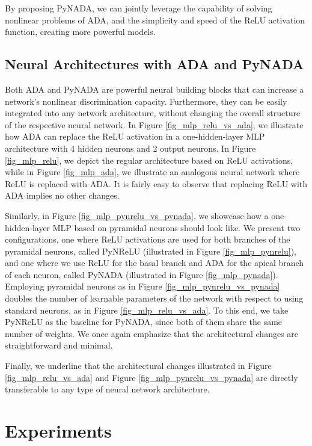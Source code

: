 \documentclass[pdflatex,sn-mathphys]{sn-jnl}
\theoremstyle{thmstyleone}
\theoremstyle{thmstyletwo}\newtheorem{example}{Example}\newtheorem{remark}{Remark}
\theoremstyle{thmstylethree}\newtheorem{definition}{Definition}\DeclareMathOperator{\sinc}{sinc}
\begin{document}
By proposing PyNADA, we can jointly leverage the capability of solving nonlinear problems of ADA, and the simplicity and speed of the ReLU activation function, creating more powerful models.

\subsection{Neural Architectures with ADA and PyNADA}
\label{sec_method_arch}

Both ADA and PyNADA are powerful neural building blocks that can increase a network's nonlinear discrimination capacity. Furthermore, they can be easily integrated into any network architecture, without changing the overall structure of the respective neural network. In Figure \ref{fig_mlp_relu_vs_ada}, we illustrate how ADA can replace the ReLU activation in a one-hidden-layer MLP architecture with 4 hidden neurons and 2 output neurons. In Figure \ref{fig_mlp_relu}, we depict the regular architecture based on ReLU activations, while in Figure \ref{fig_mlp_ada}, we illustrate an analogous neural network where ReLU is replaced with ADA. It is fairly easy to observe that replacing ReLU with ADA implies no other changes. 

Similarly, in Figure \ref{fig_mlp_pynrelu_vs_pynada}, we showcase how a one-hidden-layer MLP based on pyramidal neurons should look like. We present two configurations, one where ReLU activations are used for both branches of the pyramidal neurons, called PyNReLU (illustrated in Figure \ref{fig_mlp_pynrelu}), and one where we use ReLU for the basal branch and ADA for the apical branch of each neuron, called PyNADA (illustrated in Figure \ref{fig_mlp_pynada}). Employing pyramidal neurons as in Figure \ref{fig_mlp_pynrelu_vs_pynada} doubles the number of learnable parameters of the network with respect to using standard neurons, as in Figure \ref{fig_mlp_relu_vs_ada}. To this end, we take PyNReLU as the baseline for PyNADA, since both of them share the same number of weights. We once again emphasize that the architectural changes are straightforward and minimal.

Finally, we underline that the architectural changes illustrated in Figure \ref{fig_mlp_relu_vs_ada} and Figure \ref{fig_mlp_pynrelu_vs_pynada} are directly transferable to any type of neural network architecture.

\section{Experiments}
\label{sec_experiments}
\end{document}
